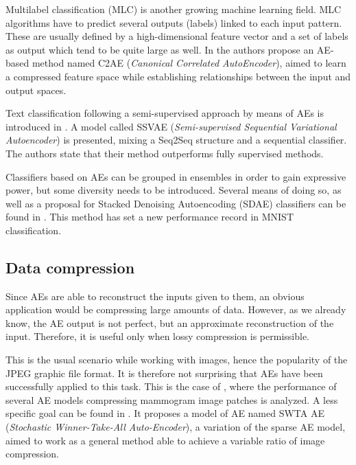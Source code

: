 \documentclass[preprint,5p,compress]{elsarticle}
\begin{document}
Multilabel classification \cite{Charte:SB-MLC} (MLC) is another growing machine learning field. MLC algorithms have to predict several outputs (labels) linked to each input pattern. These are usually defined by a high-dimensional feature vector and a set of labels as output which tend to be quite large as well. In \cite{MLC-DL} the authors propose an AE-based method named C2AE (\textit{Canonical Correlated AutoEncoder}), aimed to learn a compressed feature space while establishing relationships between the input and output spaces.

Text classification following a semi-supervised approach by means of AEs is introduced in \cite{Xu2017VariationalAF}. A model called SSVAE (\textit{Semi-supervised Sequential Variational Autoencoder}) is presented, mixing a Seq2Seq \cite{Seq2Seq} structure and a sequential classifier. The authors state that their method outperforms fully supervised methods.

Classifiers based on AEs can be grouped in ensembles in order to gain expressive power, but some diversity needs to be introduced. Several means of doing so, as well as a proposal for Stacked Denoising Autoencoding (SDAE) classifiers can be found in \cite{Alvear_Sandoval_2018}. This method has set a new performance record in MNIST classification.


\subsection{Data compression}
Since AEs are able to reconstruct the inputs given to them, an obvious application would be compressing large amounts of data. However, as we already know, the AE output is not perfect, but an approximate reconstruction of the input. Therefore, it is useful only when lossy compression is permissible. 

This is the usual scenario while working with images, hence the popularity of the JPEG \cite{JPEG} graphic file format. It is therefore not surprising that AEs have been successfully applied to this task. This is the case of \cite{tan_using_2011}, where the performance of several AE models compressing mammogram image patches is analyzed. A less specific goal can be found in \cite{AEImageCompress}. It proposes a model of AE named SWTA AE (\textit{Stochastic Winner-Take-All Auto-Encoder}), a variation of the sparse AE model, aimed to work as a general method able to achieve a variable ratio of image compression.
\end{document}
